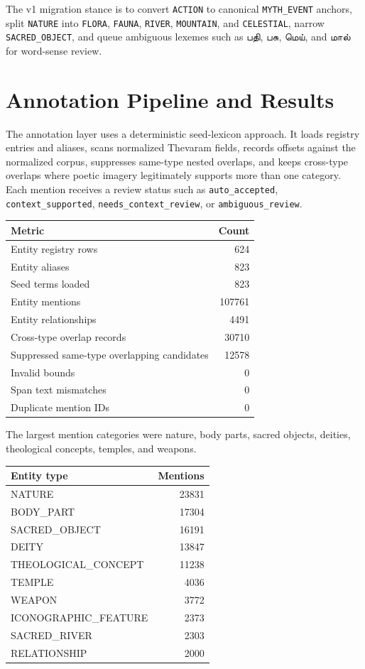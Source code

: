 \documentclass[11pt]{article}
\newcommand{\ta}[1]{{\tamilfont #1}}
\begin{document}
The v1 migration stance is to convert \texttt{ACTION} to canonical \texttt{MYTH\_EVENT} anchors, split \texttt{NATURE} into \texttt{FLORA}, \texttt{FAUNA}, \texttt{RIVER}, \texttt{MOUNTAIN}, and \texttt{CELESTIAL}, narrow \texttt{SACRED\_OBJECT}, and queue ambiguous lexemes such as \ta{பதி}, \ta{பசு}, \ta{மெய்}, and \ta{மால்} for word-sense review.

\section{Annotation Pipeline and Results}
The annotation layer uses a deterministic seed-lexicon approach. It loads registry entries and aliases, scans normalized Thevaram fields, records offsets against the normalized corpus, suppresses same-type nested overlaps, and keeps cross-type overlaps where poetic imagery legitimately supports more than one category. Each mention receives a review status such as \texttt{auto\_accepted}, \texttt{context\_supported}, \texttt{needs\_context\_review}, or \texttt{ambiguous\_review}.

\begin{longtable}{lr}
\toprule
Metric & Count \\
\midrule
Entity registry rows & 624 \\
Entity aliases & 823 \\
Seed terms loaded & 823 \\
Entity mentions & 107761 \\
Entity relationships & 4491 \\
Cross-type overlap records & 30710 \\
Suppressed same-type overlapping candidates & 12578 \\
Invalid bounds & 0 \\
Span text mismatches & 0 \\
Duplicate mention IDs & 0 \\
\bottomrule
\end{longtable}

The largest mention categories were nature, body parts, sacred objects, deities, theological concepts, temples, and weapons.

\begin{longtable}{lr}
\toprule
Entity type & Mentions \\
\midrule
NATURE & 23831 \\
BODY\_PART & 17304 \\
SACRED\_OBJECT & 16191 \\
DEITY & 13847 \\
THEOLOGICAL\_CONCEPT & 11238 \\
TEMPLE & 4036 \\
WEAPON & 3772 \\
ICONOGRAPHIC\_FEATURE & 2373 \\
SACRED\_RIVER & 2303 \\
RELATIONSHIP & 2000 \\
\bottomrule
\end{longtable}
\end{document}
